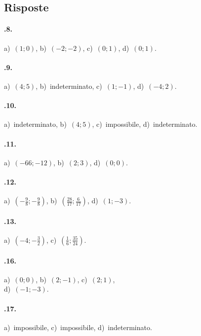 \subsection{Risposte}
\begin{multicols}{2}
\paragraph{\thechapter.8.} a)~$(1;0)$, b)~$(-2;-2)$, c)~$(0;1)$, d)~$(0;1)$.

\paragraph{\thechapter.9.} a)~$(4;5)$, b)~indeterminato, c)~$(1;-1)$, d)~$(-4;2)$.

\paragraph{\thechapter.10.} a)~indeterminato, b)~$(4;5)$, c)~impossibile, d)~indeterminato.
	
\paragraph{\thechapter.11.} a)~$(-66;-12)$, b)~$(2;3)$, d)~$(0;0)$.

\paragraph{\thechapter.12.} a)~$\left(-{\frac{9}{8}};-\frac{9}{8}\right)$, b)~$\left(\frac{28}{17};\frac{6}{17}\right)$, d)~$(1;-3)$.

\paragraph{\thechapter.13.} a)~$\left(-4;-{\frac{3}{2}}\right)$, c)~$\left(\frac{1}{6};\frac{35}{24}\right)$.

\paragraph{\thechapter.16.} a)~$(0;0)$, b)~$(2;-1)$, c)~$(2;1)$, \protect\\d)~$(-1;-3)$.

\paragraph{\thechapter.17.} a)~impossibile, c)~impossibile, d)~indeterminato.


\end{multicols}
